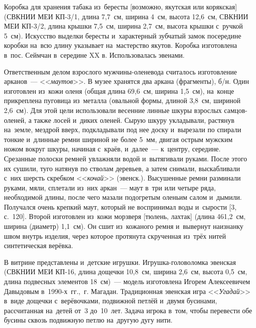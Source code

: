 Коробка для хранения табака из~бересты [возможно, якутская или корякская] (СВКНИИ МЕИ КП-3/1, длина 7,7~см, ширина 4~см, высота 12,6~см, СВКНИИ МЕИ КП-3/2, длина крышки 7,5~см, ширина 2,7~см, высота крышки с~ручкой 5~см). Искусство выделки бересты и~характерный зубчатый замок посередине коробки на~всю длину указывает на~мастерство якутов. Коробка изготовлена в~пос. Сеймчан в~середине XX в. Использовалась эвенами.

Ответственным делом взрослого мужчины-оленевода считалось изготовление арканов~--- <<\textit{маутов}>>. В музее хранятся два аркана (фрагменты), б/н. Один изготовлен из~кожи оленя (общая длина 69,6~см, ширина 1,5~см), на~конце прикреплена пуговица из~металла (овальной формы, длиной 3,8~см, шириной 2,6~см). Для этой цели использовали весенние линные шкуры взрослых самцов-оленей, а также лосей и~диких оленей. Сырую шкуру укладывали, растянув на~земле, мездрой вверх, подкладывали под нее доску и~вырезали по спирали тонкие и~длинные ремни шириной не более 5~мм, двигая острым мужским ножом вокруг шкуры, начиная с~краёв, и~далее~--- к~центру, середине. Срезанные полоски ремней увлажняли водой и~вытягивали руками. После этого их сушили, туго натянув по стволам деревьев, а затем снимали, выскабливали с~них шерсть скребком <<\textit{кочай}>> (эвенск.). Высушенные ремни разминали руками, мяли, сплетали из~них аркан~--- маут в~три или четыре ряда, необходимой длины, после чего мазали подогретым оленьим салом и~дымили. Получался очень крепкий маут, который не воспринимал воды и~сырости [3, с.~120]. Второй изготовлен из~кожи морзверя [тюлень, лахтак] (длина 461,2~см, ширина (диаметр) 1,1~см). Он сшит из~кожаного ремня и~вывернут наизнанку швом внутрь изделия, через которое протянута скрученная из~трёх нитей синтетическая верёвка.

В витрине представлены и~детские игрушки. Игрушка-головоломка эвенская (СВКНИИ МЕИ КП-16, длина дощечки 10,8~см, ширина 2,6~см, высота 0,5~см, длина подвесных элементов 18~см)~--- модель изготовлена Игорем Алексеевичем Давыдовым в~1990-х~гг.,~г. Магадан. Традиционная эвенская игра <<\textit{Угадай}>> в~виде дощечки с~верёвочками, подвижной петлёй и~двумя бусинами, рассчитанная на~детей от~3 до~10~лет. Задача игрока в~том, чтобы перевести обе бусины сквозь подвижную петлю на~другую дугу нити.

